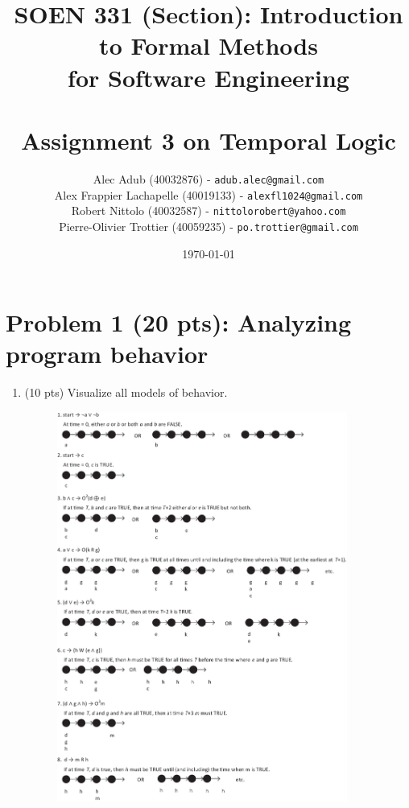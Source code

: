 \documentclass[12pt]{article}
\title{SOEN 331 (Section): Introduction to Formal Methods\\for Software Engineering\\
\ \\
Assignment 3 on Temporal Logic}
\author{\begin{tabular}{c}
Alec Adub (40032876) - \texttt{adub.alec@gmail.com} \tabularnewline
Alex Frappier Lachapelle (40019133) - \texttt{alexfl1024@gmail.com} \tabularnewline
Robert Nittolo (40032587) - \texttt{nittolorobert@yahoo.com} \tabularnewline
Pierre-Olivier Trottier (40059235) - \texttt{po.trottier@gmail.com} \tabularnewline\\
\end{tabular}
}
\date{\today}
\begin{document}
\maketitle

\newpage

\section*{Problem 1 (20 pts):  Analyzing program behavior}

\begin{enumerate}

\item (10 pts) Visualize all models of behavior.

\begin{figure}[h!]
  \centering
  \includegraphics[width=0.9\textwidth]{q1-part1.pdf}
\end{figure}

\newpage


\end{enumerate}
\end{document}
